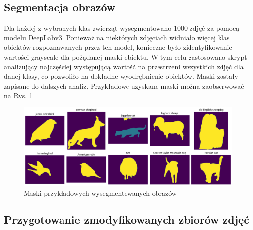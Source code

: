 \subsection*{Segmentacja obrazów}

Dla każdej z wybranych klas zwierząt wysegmentowano 1000 zdjęć za pomocą modelu DeepLabv3. Ponieważ na niektórych 
zdjęciach widniało więcej klas obiektów rozpoznawanych przez ten model, konieczne było zidentyfikowanie wartości grayscale dla pożądanej maski 
obiektu. W tym celu zastosowano skrypt analizujący najczęściej występującą wartość na przestrzeni wszystkich zdjęć 
dla danej klasy, co pozwoliło na dokładne wyodrębnienie obiektów. Maski zostały zapisane do dalszych analiz. Przykładowe uzyskane
maski można zaobserwować na Rys. \ref{rys:masks}

\begin{figure}
	\centering\includegraphics[width=.9\textwidth]{img/masks}
	\caption{Maski przykładowych wysegmentowanych obrazów}  \label{rys:masks}
\end{figure}

\subsection*{Przygotowanie zmodyfikowanych zbiorów zdjęć}

